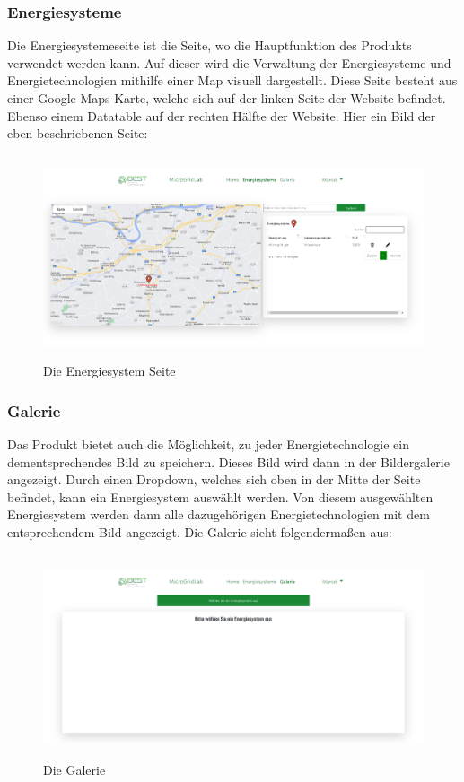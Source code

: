 \subsubsection{Energiesysteme}
Die Energiesystemeseite ist die Seite, wo die Hauptfunktion des Produkts verwendet werden kann. Auf dieser wird die Verwaltung der Energiesysteme und Energietechnologien mithilfe einer Map visuell dargestellt. Diese Seite besteht aus einer Google Maps Karte, welche sich auf der linken Seite der Website befindet. Ebenso einem Datatable auf der rechten Hälfte der Website. Hier ein Bild der eben beschriebenen Seite:
\begin{figure}[h]
	\centering
	\includegraphics[height=6cm,width=14cm]{images/EnergiesystemSeite}
	\caption{Die Energiesystem Seite}
	\label{fig:Energiesystem Seite}
\end{figure}

\subsubsection{Galerie}
Das Produkt bietet auch die Möglichkeit, zu jeder Energietechnologie ein dementsprechendes Bild zu speichern. Dieses Bild wird dann in der Bildergalerie angezeigt. Durch einen Dropdown, welches sich oben in der Mitte der Seite befindet, kann ein Energiesystem auswählt werden. Von diesem ausgewählten Energiesystem werden dann alle dazugehörigen Energietechnologien mit dem entsprechendem Bild angezeigt. Die Galerie sieht folgendermaßen aus:
\begin{figure}[h]
	\centering
	\includegraphics[height=6cm,width=14cm]{images/GalerieSeite}
	\caption{Die Galerie}
	\label{fig:Galerie}
\end{figure}


